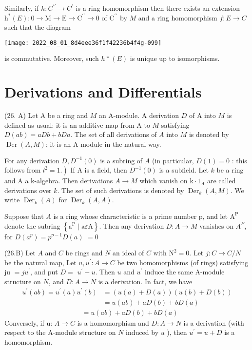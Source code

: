 Similarly, if $h: C^{\prime \prime} \rightarrow C^{\prime}$ is a ring homomorphism then there exists an extension $\mathrm{h}^{*}(E): 0 \rightarrow \mathrm{M} \rightarrow \mathrm{E} \rightarrow \mathrm{C}^{\prime \prime} \rightarrow 0$ of $\mathrm{C}^{\prime \prime}$ by $M$ and a ring homomorphism $f: E \rightarrow C$ such that the diagram

\texttt{[image: 2022\_08\_01\_8d4eee36f1f42236b4f4g-099]}

is commutative. Moreover, such $h *(E)$ is unique up to isomorphisms.

\section{Derivations and Differentials}
(26. A) Let A be a ring and $M$ an A-module. A derivation $D$ of A into $M$ is defined as usual: it is an additive map from A to $M$ satisfying $D(a b)=a D b+b D a$. The set of all derivations of $A$ into $M$ is denoted by $\operatorname{Der}(A, M)$; it is an A-module in the natural way.

For any derivation $D, D^{-1}(0)$ is a subring of $A$ (in particular, $D(1)=0$ : this follows from $\left.l^{2}=1 .\right)$ If A is a field, then $D^{-1}(0)$ is a subfield. Let $k$ be a ring and A a k-algebra. Then derivations $A \rightarrow M$ which vanish on $\mathrm{k} \cdot 1_{A}$ are called derivations over $k$. The set of such derivations is denoted by $\operatorname{Der}_{k}(A, M)$. We write $\operatorname{Der}_{k}(A)$ for $\operatorname{Der}_{k}(A, A)$.

Suppose that $A$ is a ring whose characteristic is a prime number $\mathrm{p}$, and let $\mathrm{A}^{\mathrm{P}}$ denote the subring $\left\{\mathrm{a}^{\mathrm{P}} \mid \mathrm{a} \varepsilon \mathrm{A}\right\}$. Then any derivation $D: A \rightarrow M$ vanishes on $A^{P}$, for $D\left(a^{p}\right)=p^{p-1} D(a)$ $=0$

(26.B) Let $A$ and $C$ be rings and $N$ an ideal of $C$ with $\mathrm{N}^{2}=0$. Let $j: C \rightarrow C / N$ be the natural map, Let $u, u^{\prime}: A \rightarrow C$ be two homomorphisms (of rings) satisfying ju $=j u^{\prime}$, and put $D=$ $u^{\prime}-u$. Then $u$ and $u^{\prime}$ induce the same A-module structure on $N$, and $D: A \rightarrow N$ is a derivation. In fact, we have
$$
\begin{aligned}
u^{\prime}(a b)=u^{\prime}(a) u^{\prime}(b) &=(u(a)+D(a))(u(b)+D(b)) \\
&=u(a b)+a D(b)+b D(a)
\end{aligned}
$$
$$
\begin{aligned}
& =u(a b)+a D(b)+b D(a)
\end{aligned}
$$
Conversely, if u: $A \rightarrow C$ is a homomorphism and $D: A \rightarrow N$ is a derivation (with respect to the A-module structure on $N$ induced by $u$ ), then $u^{\prime}=u+D$ is a homomorphism.

